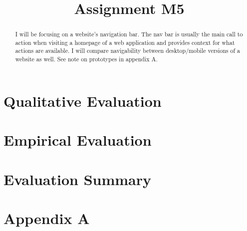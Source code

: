 

\title{Assignment M5\\}



\maketitle
\thispagestyle{fancy}

\begin{abstract}
I will be focusing on a website’s navigation bar. The nav bar is usually the main call to action when visiting a homepage of a web application and provides context for what actions are available. I will compare navigability between desktop/mobile versions of a website as well. See note on prototypes in appendix A.
\end{abstract}

\section{Qualitative Evaluation}

\section{Empirical Evaluation}

\section{Evaluation Summary}

\clearpage

\section{Appendix A}


